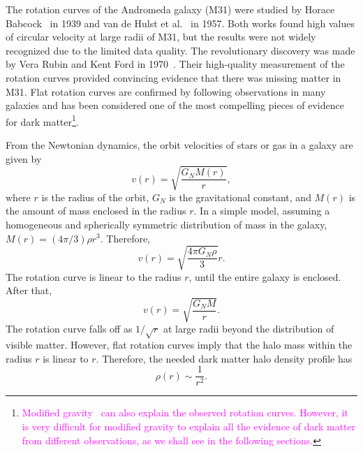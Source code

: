\documentclass[doublespace,nopageskip]{VTthesis} %
\newcommand{\DS}[1]{\textcolor{magenta}{#1}}
\begin{document}
The rotation curves of the Andromeda galaxy (M31) were studied by Horace Babcock~\cite{1939LicOB..19....1B} in 1939 and van de Hulst et al.~\cite{1957BAN....14....1V} in 1957. Both works found high values of circular velocity at large radii of M31, but the results were not widely recognized due to the limited data quality. The revolutionary discovery was made by Vera Rubin and Kent Ford in 1970~\cite{1970ApJ...159..379R}. Their high-quality measurement of the rotation curves provided convincing evidence that there was missing matter in M31. Flat rotation curves are confirmed by following observations in many galaxies and has been considered one of the most compelling pieces of evidence for dark matter\footnote{\DS{Modified gravity~\cite{1983ApJ...270..365M} can also explain the observed rotation curves. However, it is very difficult for modified gravity to explain all the evidence of dark matter from different observations, as we shall see in the following sections.}}.

From the Newtonian dynamics, the orbit velocities of stars or gas in a galaxy are given by
\begin{equation}
    v(r) = \sqrt{\frac{G_N M(r)}{r}},
\end{equation}
where $r$ is the radius of the orbit, $G_N$ is the gravitational constant, and $M(r)$ is the amount of mass enclosed in the radius $r$. In a simple model, assuming a homogeneous and spherically symmetric distribution of mass in the galaxy, $M(r) = (4\pi/3)\rho r^3$. Therefore,
\begin{equation}
    v(r) = \sqrt{\frac{4\pi G_N \rho}{3}}r.
\end{equation}
The rotation curve is linear to the radius $r$, until the entire galaxy is enclosed. After that,
\begin{equation}
    v(r) = \sqrt{\frac{G_N M}{r}}.
\end{equation}
The rotation curve falls off as $1/\sqrt{r}$ at large radii beyond the distribution of visible matter. However, flat rotation curves imply that the halo mass within the radius $r$ is linear to $r$. Therefore, the needed dark matter halo density profile has
\begin{equation}
    \rho(r) \sim \frac{1}{r^2}.
\end{equation}
\end{document}
